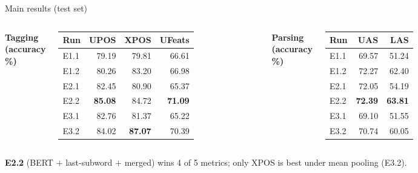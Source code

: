 \documentclass{beamer}
\begin{document}
\begin{frame}{Main results (test set)}
\scriptsize
\begin{columns}[T]
\centering\textbf{Tagging (accuracy \%)}\\[2pt]
\begin{tabular}{lrrr}
\toprule
Run & UPOS & XPOS & UFeats \\
\midrule
E1.1 & 79.19 & 79.81 & 66.61 \\
E1.2 & 80.26 & 83.20 & 66.98 \\
E2.1 & 82.45 & 80.90 & 65.37 \\
\rowcolor{tumcolor-green!22}
E2.2 & \textbf{85.08} & 84.72 & \textbf{71.09} \\
E3.1 & 82.76 & 81.37 & 65.22 \\
E3.2 & 84.02 & \textbf{87.07} & 70.39 \\
\bottomrule
\end{tabular}
\centering\textbf{Parsing (accuracy \%)}\\[2pt]
\begin{tabular}{lrr}
\toprule
Run & UAS & LAS \\
\midrule
E1.1 & 69.57 & 51.24 \\
E1.2 & 72.27 & 62.40 \\
E2.1 & 72.05 & 54.19 \\
\rowcolor{tumcolor-green!22}
E2.2 & \textbf{72.39} & \textbf{63.81} \\
E3.1 & 69.10 & 51.55 \\
E3.2 & 70.74 & 60.05 \\
\bottomrule
\end{tabular}
\end{columns}
\vspace{0.25cm}
\centering\footnotesize
\textbf{E2.2} (BERT $+$ last-subword $+$ merged) wins 4 of 5 metrics;
only XPOS is best under mean pooling (E3.2).
\end{frame}
\end{document}

